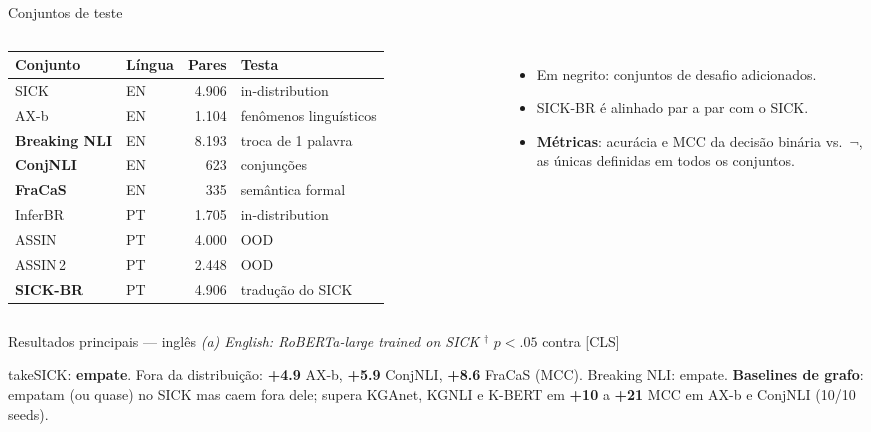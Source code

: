 \documentclass[aspectratio=169,10pt]{beamer}
\newcommand{\up}[1]{\textcolor{logic}{\textbf{#1}}}
\newcommand{\take}[1]{\vspace{4pt}\begin{beamercolorbox}[sep=5pt,rounded=true]{take}\small #1\end{beamercolorbox}}
\newcommand{\tbl}[3][1]{{\setlength{\textwidth}{#2}\resizebox{#1\linewidth}{!}{}}}
\begin{document}
\begin{frame}{Conjuntos de teste}
\begin{columns}[T]
\small
\begin{tabular}{@{}llrl@{}}
\toprule
Conjunto & Língua & Pares & Testa \\
\midrule
SICK & EN & 4.906 & in-distribution \\
AX-b & EN & 1.104 & fenômenos linguísticos \\
\textbf{Breaking NLI} & EN & 8.193 & troca de 1 palavra \\
\textbf{ConjNLI} & EN & 623 & conjunções \\
\textbf{FraCaS} & EN & 335 & semântica formal \\
\midrule
InferBR & PT & 1.705 & in-distribution \\
ASSIN & PT & 4.000 & OOD \\
ASSIN\,2 & PT & 2.448 & OOD \\
\textbf{SICK-BR} & PT & 4.906 & tradução do SICK \\
\bottomrule
\end{tabular}
\small
\begin{itemize}
\item Em negrito: conjuntos de desafio adicionados.
\item SICK-BR é alinhado par a par com o SICK.
\item \textbf{Métricas}: acurácia e MCC da decisão binária \E{} vs.\ $\neg$\E{}, as únicas definidas em todos os conjuntos.
\end{itemize}
\end{columns}
\end{frame}

\begin{frame}{Resultados principais --- inglês}
\textit{\small (a) English: RoBERTa-large trained on SICK} \hfill {\scriptsize $^\dagger$ $p<.05$ contra [CLS]}\\[3pt]
\tbl{18.5cm}{main_en}
\take{SICK: \textbf{empate}. Fora da distribuição: \up{+4.9} AX-b, \up{+5.9} ConjNLI, \up{+8.6} FraCaS (MCC). Breaking NLI: empate. \textbf{Baselines de grafo}: empatam (ou quase) no SICK mas caem fora dele; \model{} supera KGAnet, KGNLI e K-BERT em \up{+10} a \up{+21} MCC em AX-b e ConjNLI (10/10 seeds).}
\end{frame}
\end{document}
